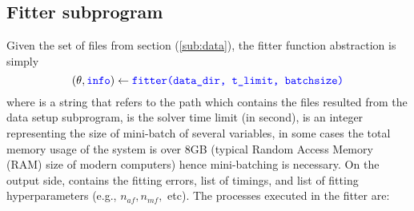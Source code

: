 \documentclass[12pt]{article}
\begin{document}
\subsection{Fitter subprogram}
\label{sub:}
Given the set of files from section (\ref{sub:data}), the fitter function abstraction is simply
\begin{equation}
	(\theta, \codeword{info}) \leftarrow \codeword{fitter(data_dir, t_limit, batchsize)}
\end{equation}
where  is a string that refers to the path which contains the files resulted from the data setup subprogram,  is the solver time limit (in second),  is an integer representing the size of mini-batch of several variables, in some cases the total memory usage of the system is over 8GB (typical Random Access Memory (RAM) size of modern computers) hence mini-batching is necessary. On the output side,  contains the fitting errors, list of timings, and list of fitting hyperparameters (e.g., $n_{af}, n_{mf},$ etc). The processes executed in the fitter are:
\end{document}
